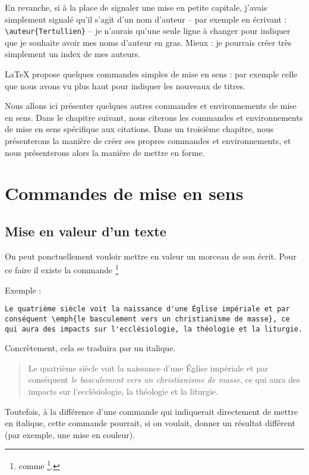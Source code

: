 En revanche, si à la place de signaler une mise en petite capitale, j'avais simplement signalé qu'il s'agit d'un nom d'auteur -- par exemple en écrivant : \verb|\auteur{Tertullien}| -- je n'aurais qu'une seule ligne à changer pour indiquer que je souhaite avoir mes noms d'auteur en gras. Mieux : je pourrais créer très simplement un index de mes auteurs.

LaTeX propose quelques commandes simples de mise en sens  : par exemple celle que nous avons vu plus haut pour indiquer les nouveaux de titres.

Nous allons ici présenter quelques autres commandes et environnements de mise en sens. Dans le chapitre suivant, nous citerons les commandes et environnements de mise en sens spécifique aux citations. Dans un troisième chapitre, nous présenterons la manière de créer ses propres commandes et environnements, et nous présenterons alors la manière de mettre en forme.

\section{Commandes de mise en sens}

\subsection{Mise en valeur d'un texte}

On peut ponctuellement vouloir mettre en valeur un morceau de son écrit. Pour ce faire il existe la commande \footnote{ comme \footnote{emphase}.}

Exemple :

\begin{verbatim}
Le quatrième siècle voit la naissance d'une Église impériale et par conséquent \emph{le basculement vers un christianisme de masse}, ce qui aura des impacts sur l'ecclésiologie, la théologie et la liturgie.
\end{verbatim}

Concrètement, cela se traduira par un italique. 

\begin{quotation}
Le quatrième siècle voit la naissance d'une Église impériale et par conséquent \emph{le basculement vers un christianisme de masse}, ce qui aura des impacts sur l'ecclésiologie, la théologie et la liturgie.
\end{quotation}

Toutefois, à la différence d'une commande qui indiquerait directement de mettre en italique, cette commande pourrait, si on voulait, donner un résultat différent (par exemple, une mise en couleur). 

